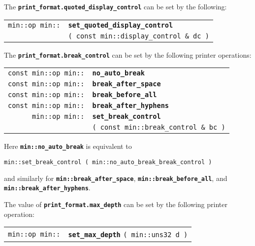 \documentclass[12pt]{article}
\makeatletter
\newcommand{\TT}[1]{{\tt \bfseries #1}}
\newcommand{\ttindex}[1]{\index{#1@{\tt #1}}}
\newcommand{\EOL}{\penalty \exhyphenpenalty}
\newenvironment{indpar}[1][0.3in]%
	{\begin{list}{}%
		     {\setlength{\itemsep}{0in}%
		      \setlength{\topsep}{0in}%
		      \setlength{\parsep}{1ex}%
		      \setlength{\labelwidth}{#1}%
		      \setlength{\leftmargin}{#1}%
		      \addtolength{\leftmargin}{\labelsep}}%
	 \item}%
	{\end{list}}
\newcommand{\LABEL}[1]{\label{#1}}
\newlength{\ARGBREAKLENGTH}
\newcommand{\ARGBREAK}[1][\ARGBREAKLENGTH]{\\&\hspace*{#1}}
\newcommand{\MINKEY}[1]%
	   {\TT{#1}\ttindex{min::#1}\ttindex{#1}}
\makeatother
\begin{document}
The \TT{print\_format.quoted\_display\_control} can be set by the following:

\begin{indpar}[1em]\begin{tabular}{r@{}l}
\verb|min::op min::|
    & \MINKEY{set\_quoted\_display\_control}\ARGBREAK
          \verb|( const min::display_control & dc )|
\LABEL{MIN::SET_QUOTED_DISPLAY_CONTROL} \\
\end{tabular}\end{indpar}

The \TT{print\_format.break\_control} can be set by the following
printer operations:

\begin{indpar}[1em]\begin{tabular}{r@{}l}
\verb|const min::op min::| & \MINKEY{no\_auto\_break}
\LABEL{MIN::NO_AUTO_BREAK} \\
\verb|const min::op min::| & \MINKEY{break\_after\_space}
\LABEL{MIN::BREAK_AFTER_SPACE} \\
\verb|const min::op min::| & \MINKEY{break\_before\_all}
\LABEL{MIN::BREAK_BEFORE_ALL} \\
\verb|const min::op min::| & \MINKEY{break\_after\_hyphens}
\LABEL{MIN::BREAK_AFTER_HYPHENS} \\
\verb|min::op min::|
    & \MINKEY{set\_break\_control}\ARGBREAK
          \verb|( const min::break_control & bc )|
\LABEL{MIN::SET_BREAK_CONTROL} \\
\end{tabular}\end{indpar}

Here \TT{min::no\_auto\_break} is equivalent to
\begin{center}
\verb|min::set_break_control ( min::no_auto_break_break_control )|
\end{center}
and similarly for \TT{min::break\_\EOL after\_\EOL space},
\TT{min::break\_\EOL before\_\EOL all},
and \TT{min::break\_\EOL after\_\EOL hyphens}.

The value of \TT{print\_format.max\_depth} can be set by the following
printer operation:

\begin{indpar}[1em]\begin{tabular}{r@{}l}
\verb|min::op min::|
    & \MINKEY{set\_max\_depth} \verb|( min::uns32 d )|
\LABEL{MIN::SET_MAX_DEPTH} \\
\end{tabular}\end{indpar}
\end{document}
